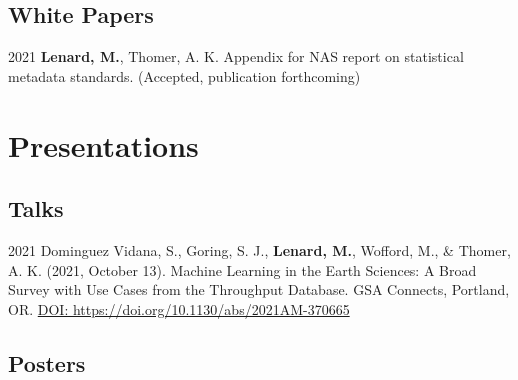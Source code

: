 \documentclass[12pt,letterpaper]{report}
\begin{document}
\subsection*{White Papers}

\begin{tablist}

	\item[2021] \tab \textbf{Lenard, M.}, Thomer, A. K. Appendix for NAS report on statistical metadata standards. (Accepted, publication forthcoming)
	
\end{tablist}



\section*{Presentations}

\subsection*{Talks}

\begin{tablist}

	\item[2021] \tab Dominguez Vidana, S., Goring, S. J., \textbf{Lenard, M.}, Wofford, M., \& Thomer, A. K. (2021, October 13). Machine Learning in the Earth Sciences: A Broad Survey with Use Cases from the Throughput Database. GSA Connects, Portland, OR. \href{https://doi.org/10.1130/abs/2021AM-370665}{DOI: https://doi.org/10.1130/abs/2021AM-370665}
	    

\end{tablist}
    
\subsection*{Posters}
    
\end{document}
